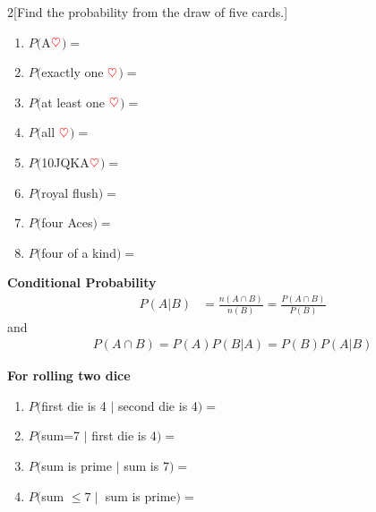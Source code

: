 \documentclass[14pt]{extarticle}
\begin{document}
\begin{multicols}{2}[Find the probability from the draw of five cards.]
	\begin{enumerate}
		\item $P($A$\color{red}\heartsuit$$)=$ \vspace{1.6cm}
		\item $P($exactly one $\color{red}\heartsuit$$)=$ \vspace{1.6cm}
		\item $P($at least one $\color{red}\heartsuit$$)=$\vspace{1.6cm}
		\item $P($all $\color{red}\heartsuit$$)=$ \vfill\null\columnbreak
		\item $P($10JQKA$\color{red}\heartsuit$$)=$ \vspace{1.6cm}
		\item $P($royal flush$)=$ \vspace{1.6cm}
		\item $P($four Aces$)=$ \vspace{1.6cm}
		\item $P($four of a kind$)=$ \vfill\null
	\end{enumerate}
\end{multicols}

\begin{tcolorbox}[enhanced jigsaw,colback=bg,boxrule=0pt,arc=0pt] 
	\textbf{Conditional Probability}
	\begin{align*}
		P(A|B)&=\frac{n(A\cap B)}{n( B)} =  \frac{P(A\cap B)}{P(B)}
	\end{align*}
	and
	\begin{align*}
		P(A\cap B) = P(A)P(B|A) = P(B)P(A|B)
	\end{align*}
\end{tcolorbox}

\textbf{For rolling two dice}
\begin{enumerate}
	\item $P($first die is 4 $\mid$ second die is 4$)=$ \vspace{1.2cm}
	\item $P($sum=7 $\mid$ first die is 4$)=$ \vspace{1.2cm}
	\item $P($sum is prime $\mid$ sum is 7$)=$ \vspace{1.2cm}
	\item $P($sum $\leq 7 \mid$ sum is prime$)=$ \vspace{1.2cm}
\end{enumerate}
\vspace{1.2cm}
\end{document}
